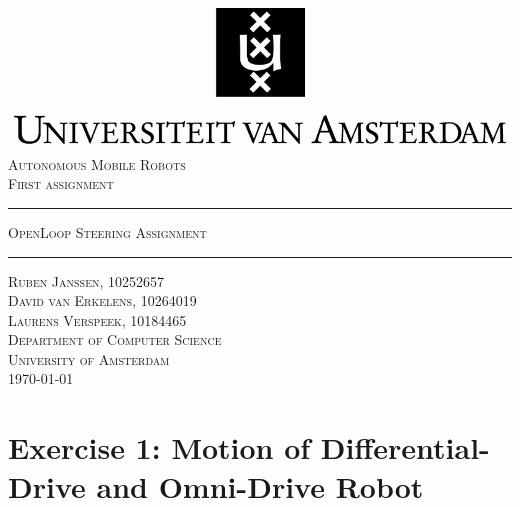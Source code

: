 \documentclass[12pt]{article}
\begin{document}
\begin{titlepage}
\begin{center}
    \includegraphics[width=\textwidth]{./logo.png}
    \\ [2.5cm]
    \textsc{\Large Autonomous Mobile Robots}
    \\ [0.5cm]
    \textsc{\large First assignment}
    \\ [1cm]
    \hrule
    \vspace{0.3cm}
    \textsc{OpenLoop Steering Assignment}
    \\ [0.3cm]
    \hrule
    \vfill
    \textsc{Ruben Janssen, 10252657 \\ David van Erkelens, 10264019 \\ Laurens Verspeek, 10184465 \\[0.7cm] Department of Computer Science \\ University of Amsterdam \\[0.3cm] \today}
\end{center}
\end{titlepage}
\tableofcontents
\clearpage
\section{Exercise 1: Motion of Differential-Drive and Omni-Drive Robot}
\end{document}

